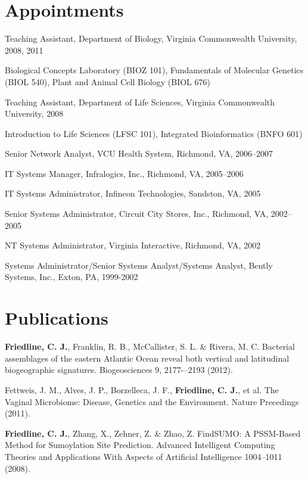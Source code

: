 \section{Appointments}

\begin{packed_item}
	\item{Teaching Assistant, Department of Biology, Virginia Commonwealth University, 2008, 2011}
	
	\begin{packed_item}
	\item{Biological Concepts Laboratory (BIOZ 101), 
	Fundamentals of Molecular Genetics (BIOL 540), 
	Plant and Animal Cell Biology (BIOL 676) }
	\end{packed_item}
	
	\item{Teaching Assistant, Department of Life Sciences, Virginia Commonwealth University, 2008}
	
	\begin{packed_item}
	\item{Introduction to Life Sciences (LFSC 101), Integrated Bioinformatics (BNFO 601)}
	\end{packed_item}
	
	\item{Senior Network Analyst, VCU Health System, Richmond, VA, 
	2006--2007}
	\item{IT Systems Manager, Infralogics, Inc., Richmond, VA, 2005--2006}
	\item{IT Systems Administrator, Infineon Technologies, Sandston, VA, 2005}
	\item{Senior Systems Administrator, Circuit City Stores, Inc., Richmond, VA, 2002--2005}
	\item{NT Systems Administrator, Virginia Interactive, Richmond, VA, 2002}
	\item{Systems Administrator/Senior Systems Analyst/Systems Analyst, Bently Systems, 
	Inc., Exton, PA, 1999-2002}
\end{packed_item}

\section{Publications}

\begin{packed_item}	
	\item{\textbf{Friedline, C. J.}, Franklin, R. B., McCallister, S. L. \& Rivera, M. C. Bacterial assemblages of the 
	eastern Atlantic Ocean reveal both vertical and latitudinal biogeographic signatures. 
	Biogeosciences 9, 2177-–2193 (2012).}
	
	\item{Fettweis, J. M., Alves, J. P., Borzelleca, J. F., \textbf{Friedline, C. J.}, et al. The Vaginal Microbiome: 
	Disease, Genetics and the Environment. Nature Precedings (2011).}
	
	\item{\textbf{Friedline, C. J.}, Zhang, X., Zehner, Z. \& Zhao, Z. FindSUMO: A PSSM-Based Method for 
	Sumoylation Site Prediction. Advanced Intelligent Computing Theories and Applications With Aspects 
	of Artificial Intelligence 1004--1011 (2008).}
\end{packed_item}


